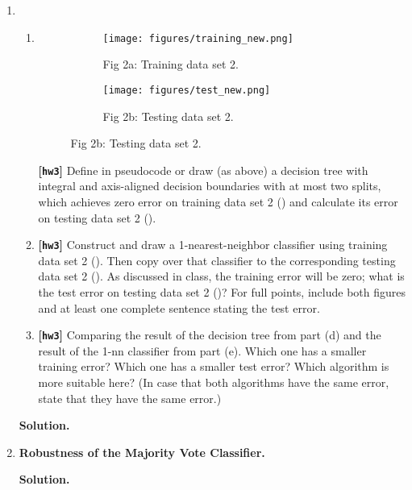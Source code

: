 \documentclass{article}
\def\hw{\textbf{[\texttt{hw3}]}\xspace}
\theoremstyle{definition}
\theoremstyle{remark}
\newenvironment{Q}
{%
\clearpage
\item
}
{%
\phantom{s} %
\bigskip
\textbf{Solution.}
}
\begin{document}
\begin{enumerate}[font={\Large\bfseries},left=0pt]
\begin{Q}
\begin{enumerate}
                \clearpage
            
             \item
              \begin{figure}[h]
                \centering
                \begin{subfigure}{0.49\columnwidth}
                \centering
                \texttt{[image: figures/training\_new.png]}
                \caption{Fig 2a: Training data set 2.}
                \label{fig: training 2}
                \end{subfigure}
                \begin{subfigure}{0.49\columnwidth}
                \centering
                \texttt{[image: figures/test\_new.png]}
                \caption{Fig 2b: Testing data set 2.}
                \label{fig: testing 2}
                \end{subfigure}
              \end{figure}

    \hw          Define in pseudocode or draw (as above) a decision tree with integral and axis-aligned decision boundaries with at most two splits, which achieves zero error on training data set 2 () and calculate its error on testing data set 2 ().
              
              \item \hw Construct and draw a 1-nearest-neighbor classifier using training data set 2 ().  Then copy over that classifier to the corresponding testing data set 2 ().  As discussed in class, the training error will be zero; what is the test error on testing data set 2 ()?  For full points, include both figures and at least one complete sentence stating the test error.
              
         	\item \hw Comparing the result of the decision tree from part (d) and the result of the 1-nn classifier from part (e). Which one has a smaller training error? Which one has a smaller test error? Which algorithm is more suitable here? (In case that both algorithms have the same error, state that they have the same error.)

            \end{enumerate}
          \end{Q}


\begin{Q}
   \textbf{\Large Robustness of the Majority Vote Classifier.}\\
   \def\maj{\textsc{Maj}}


\end{Q}
\end{enumerate}
\end{document}
